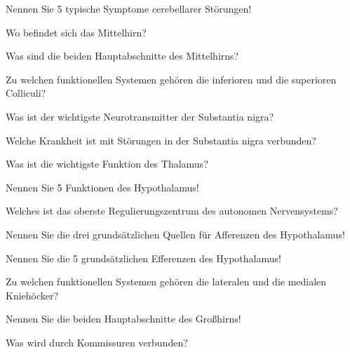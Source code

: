 \documentclass[10pt, a4paper]{exam}
\begin{document}
\begin{questions}
  \question Nennen Sie 5 typische Symptome cerebellarer Störungen!
  \begin{solution}
  \end{solution}
  \question Wo befindet sich das Mittelhirn?
  \begin{solution}
  \end{solution}
  \question Was sind die beiden Hauptabschnitte des Mittelhirns?
  \begin{solution}
  \end{solution}
  \question Zu welchen funktionellen Systemen gehören die inferioren und die superioren Colliculi?
  \begin{solution}
  \end{solution}
  \question Was ist der wichtigste Neurotransmitter der Substantia nigra?
  \begin{solution}
  \end{solution}
  \question Welche Krankheit ist mit Störungen in der Substantia nigra verbunden?
  \begin{solution}
  \end{solution}
  \question Was ist die wichtigste Funktion des Thalamus?
  \begin{solution}
  \end{solution}
  \question Nennen Sie 5 Funktionen des Hypothalamus!
  \begin{solution}
  \end{solution}
  \question Welches ist das oberste Regulierungszentrum des autonomen Nervensystems?
  \begin{solution}
  \end{solution}
  \question Nennen Sie die drei grundsätzlichen Quellen für Afferenzen des Hypothalamus!
  \begin{solution}
  \end{solution}
  \question Nennen Sie die 5 grundsätzlichen Efferenzen des Hypothalamus!
  \begin{solution}
  \end{solution}
  \question Zu welchen funktionellen Systemen gehören die lateralen und die medialen Kniehöcker?
  \begin{solution}
  \end{solution}
  \question Nennen Sie die beiden Hauptabschnitte des Großhirns!
  \begin{solution}
  \end{solution}
  \question Was wird durch Kommissuren verbunden?
  \begin{solution}
  \end{solution}

\end{questions}
\end{document}
